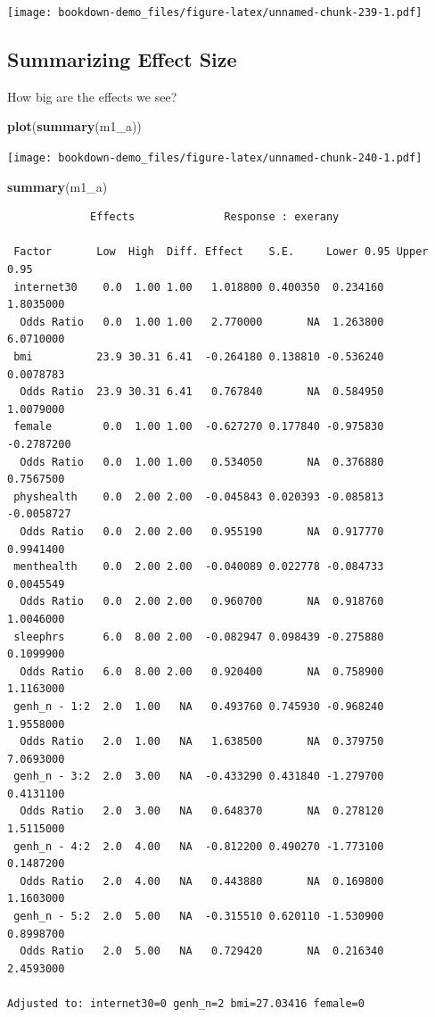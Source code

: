 \documentclass[]{book}
\newenvironment{Shaded}{\begin{snugshade}}{\end{snugshade}}
\newcommand{\KeywordTok}[1]{\textcolor[rgb]{0.13,0.29,0.53}{\textbf{#1}}}
\newcommand{\NormalTok}[1]{#1}
\theoremstyle{definition}
\theoremstyle{definition}
\theoremstyle{definition}
\theoremstyle{remark}
\begin{document}
\texttt{[image: bookdown-demo\_files/figure-latex/unnamed-chunk-239-1.pdf]}

\subsection{Summarizing Effect Size}\label{summarizing-effect-size}

How big are the effects we see?

\begin{Shaded}
\begin{Highlighting}[]
\KeywordTok{plot}\NormalTok{(}\KeywordTok{summary}\NormalTok{(m1_a))}
\end{Highlighting}
\end{Shaded}

\texttt{[image: bookdown-demo\_files/figure-latex/unnamed-chunk-240-1.pdf]}

\begin{Shaded}
\begin{Highlighting}[]
\KeywordTok{summary}\NormalTok{(m1_a)}
\end{Highlighting}
\end{Shaded}

\begin{verbatim}
             Effects              Response : exerany 

 Factor       Low  High  Diff. Effect    S.E.     Lower 0.95 Upper 0.95
 internet30    0.0  1.00 1.00   1.018800 0.400350  0.234160   1.8035000
  Odds Ratio   0.0  1.00 1.00   2.770000       NA  1.263800   6.0710000
 bmi          23.9 30.31 6.41  -0.264180 0.138810 -0.536240   0.0078783
  Odds Ratio  23.9 30.31 6.41   0.767840       NA  0.584950   1.0079000
 female        0.0  1.00 1.00  -0.627270 0.177840 -0.975830  -0.2787200
  Odds Ratio   0.0  1.00 1.00   0.534050       NA  0.376880   0.7567500
 physhealth    0.0  2.00 2.00  -0.045843 0.020393 -0.085813  -0.0058727
  Odds Ratio   0.0  2.00 2.00   0.955190       NA  0.917770   0.9941400
 menthealth    0.0  2.00 2.00  -0.040089 0.022778 -0.084733   0.0045549
  Odds Ratio   0.0  2.00 2.00   0.960700       NA  0.918760   1.0046000
 sleephrs      6.0  8.00 2.00  -0.082947 0.098439 -0.275880   0.1099900
  Odds Ratio   6.0  8.00 2.00   0.920400       NA  0.758900   1.1163000
 genh_n - 1:2  2.0  1.00   NA   0.493760 0.745930 -0.968240   1.9558000
  Odds Ratio   2.0  1.00   NA   1.638500       NA  0.379750   7.0693000
 genh_n - 3:2  2.0  3.00   NA  -0.433290 0.431840 -1.279700   0.4131100
  Odds Ratio   2.0  3.00   NA   0.648370       NA  0.278120   1.5115000
 genh_n - 4:2  2.0  4.00   NA  -0.812200 0.490270 -1.773100   0.1487200
  Odds Ratio   2.0  4.00   NA   0.443880       NA  0.169800   1.1603000
 genh_n - 5:2  2.0  5.00   NA  -0.315510 0.620110 -1.530900   0.8998700
  Odds Ratio   2.0  5.00   NA   0.729420       NA  0.216340   2.4593000

Adjusted to: internet30=0 genh_n=2 bmi=27.03416 female=0  
\end{verbatim}
\end{document}
